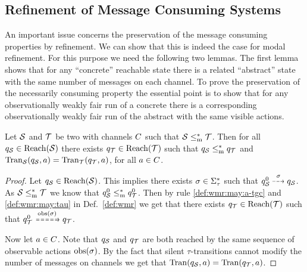 
\subsection{Refinement of Message Consuming Systems}\label{subsec:message-consuming-ref}


An important issue concerns the preservation of the message consuming properties by refinement.
We can show that this is indeed the case for modal refinement. For this purpose we need the following two lemmas.
The first lemma shows  that for any ``concrete'' reachable state there is a related ``abstract'' state with the same number of messages on each channel.
To prove the preservation of the necessarily consuming property the essential point is to show that
for any observationally weakly fair run of a concrete \MAIOTS there is a corresponding observationally weakly fair run of the abstract \MAIOTS with the same visible actions. 


\begin{lemma}\label{lem:mr-implies-equal-val}
    Let $\S$ and $\T$ be two \MAIOTSs with channels $\chan$ such that $\S \mrw \T$. Then for all $q_\S \in \reach(\S)$ there exists $q_\T \in \reach(\T)$ such that $q_\S \mrw q_\T$ and $\val_\S(q_\S,a) = \val_\T(q_\T,a)$, for all $a \in \chan$.
\end{lemma}

\begin{proof}
    Let $q_\S \in \reach(\S)$. This implies there exists $\sigma \in \Sigmat^*$ such that $q_\S^0 \may{\sigma} q_\S$. As $\S \mrw \T$ we know that $q_\S^0 \mrw q_\T^0$. Then by rule \ref{def:wmr:may:a-tgc} and \ref{def:wmr:may:tau} in Def.~\ref{def:wmr} we get that there exists $q_\T \in \reach(\T)$ such that $q_\T^0 \lmayw{\obsa(\sigma)} q_\T$. 

    Now let $a \in \chan$. Note that $q_\S$ and $q_\T$ are both reached by the same sequence of observable actions $\obsa(\sigma)$. By the fact that silent $\tau$-transitions cannot modify the number of messages on channels we get that $\val(q_\S,a) = \val(q_\T,a)$.     
\end{proof}

